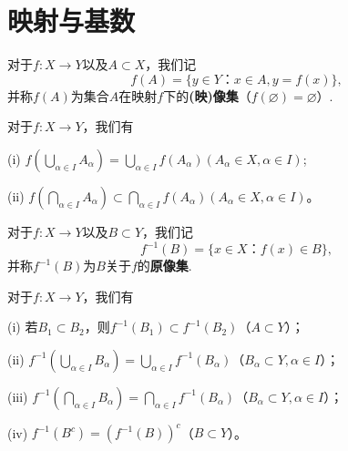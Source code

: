 \documentclass[lang=cn,newtx,10pt,scheme=chinese]{../Template/elegantbook}
\begin{document}
\section{映射与基数}

\begin{definition}[单射]\label{definition:单射}
  
\end{definition}

\begin{definition}[映射的像集]\label{definition:映射的像集}
  对于\(f:X\rightarrow Y\)以及\(A\subset X\)，我们记
\[f(A)=\{y\in Y：x\in A,y = f(x)\},\]
并称\(f(A)\)为集合\(A\)在映射\(f\)下的\textbf{(映)像集}（\(f(\varnothing)=\varnothing\)）.
\end{definition}

\begin{proposition}[映射的像集的基本性质]\label{proposition:映射的像集的基本性质}
  对于\(f:X\rightarrow Y\)，我们有

  (i) \(f\left(\bigcup_{\alpha\in I}A_{\alpha}\right)=\bigcup_{\alpha\in I}f(A_{\alpha})\left( A_{\alpha}\in X,\alpha \in I \right) \);

(ii) \(f\left(\bigcap_{\alpha\in I}A_{\alpha}\right)\subset\bigcap_{\alpha\in I}f(A_{\alpha})\left( A_{\alpha}\in X,\alpha \in I \right) \)。
\end{proposition}

\begin{definition}[映射的原像集]\label{definition:映射的原像集}
  对于\(f:X\rightarrow Y\)以及\(B\subset Y\)，我们记
\[f^{-1}(B)=\{x\in X：f(x)\in B\},\]
并称\(f^{-1}(B)\)为\(B\)关于\(f\)的\textbf{原像集}.
\end{definition}

\begin{proposition}[映射的原像集的基本性质]\label{proposition:映射的原像集的基本性质}
  对于\(f:X\rightarrow Y\)，我们有

  (i) 若\(B_1\subset B_2\)，则\(f^{-1}(B_1)\subset f^{-1}(B_2)\)（\(A\subset Y\)）；

(ii) \(f^{-1}\left(\bigcup_{\alpha\in I}B_{\alpha}\right)=\bigcup_{\alpha\in I}f^{-1}(B_{\alpha})\)（\(B_{\alpha}\subset Y,\alpha\in I\)）；

(iii) \(f^{-1}\left(\bigcap_{\alpha\in I}B_{\alpha}\right)=\bigcap_{\alpha\in I}f^{-1}(B_{\alpha})\)（\(B_{\alpha}\subset Y,\alpha\in I\)）；

(iv) \(f^{-1}(B^c)=(f^{-1}(B))^c\)（\(B\subset Y\)）。
\end{proposition}
\end{document}
